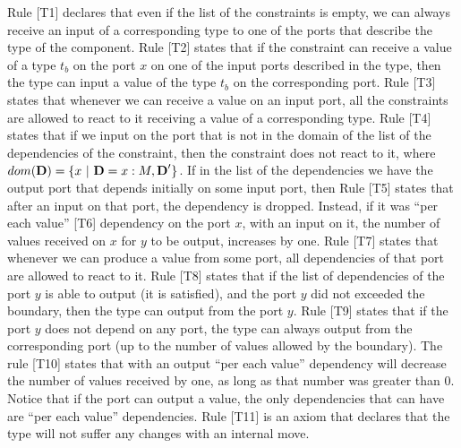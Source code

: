 Rule [T1] declares that even if the list of the constraints is empty, we can always receive an input of a corresponding type to one of the ports that describe the type of the component. Rule [T2] states that if the constraint can receive a value of a type $t_b$ on the port $x$ on one of the input ports described in the type, then the type can input a value of the type $t_b$ on the corresponding port.  Rule [T3]  states that whenever we can receive  a value  on an input  port, all the constraints  are allowed
to react to it receiving a value of a corresponding type. Rule [T4] states that if we input on the port that is not in the domain of the list of the dependencies of the constraint, then the constraint does not react to it, where $dom(\D)=\{x\ |\ \D=\pev{x}{M},\D'\}$. If in the list of the dependencies we have the output port that depends initially on some input port, then Rule [T5] states that after an input on that port, the dependency is dropped. Instead, if it was ``per each value'' [T6] dependency on the port $x$, with an input on it, the number of values received on $x$ for $y$ to be output, increases by one. Rule [T7] states that whenever we can produce a value from some port, all dependencies of that port are allowed to react to it. Rule [T8] states that if the list of dependencies of the port $y$ is able to output (it is satisfied), and the port $y$ did not exceeded the boundary, then the type can output from the port $y$. Rule [T9] states that if the port $y$ does not depend on any port, the type can always output from the corresponding port (up to the number of values allowed by the boundary). The rule [T10] states that with an output ``per each value'' dependency will decrease the number of values received by one, as long as that number was greater than 0. Notice that if the port can output a value, the only dependencies that can have are  ``per each value'' dependencies. Rule [T11] is an axiom that declares that the type will not suffer any changes with an internal move.



\vspace{1cm}


